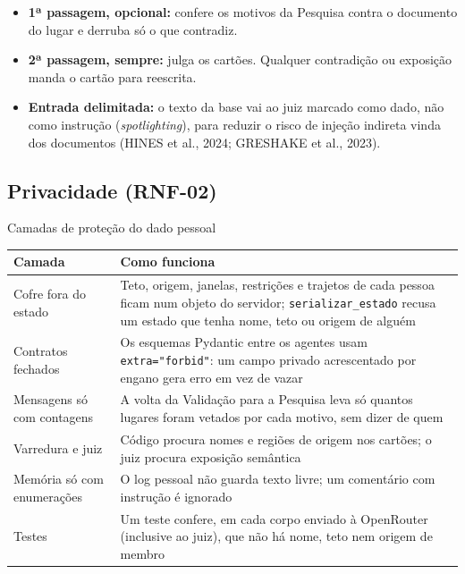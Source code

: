 \documentclass[12pt,a4paper]{article}
\newcommand{\fonte}[1]{\par\vspace{2pt}{\footnotesize\raggedright #1\par}}
\begin{document}
\begin{itemize}
\item \textbf{1ª passagem, opcional:} confere os motivos da Pesquisa contra o documento do lugar e derruba só o que contradiz.
\item \textbf{2ª passagem, sempre:} julga os cartões. Qualquer contradição ou exposição manda o cartão para reescrita.
\item \textbf{Entrada delimitada:} o texto da base vai ao juiz marcado como dado, não como instrução (\textit{spotlighting}), para reduzir o risco de injeção indireta vinda dos documentos (HINES et al., 2024; GRESHAKE et al., 2023).
\end{itemize}

\subsection{Privacidade (RNF-02)}
\begin{quadro}[H]\centering
\caption{Camadas de proteção do dado pessoal}
\small\renewcommand{\arraystretch}{1.15}
\begin{tabularx}{\textwidth}{|Y|Y|}
\hline
\textbf{Camada} & \textbf{Como funciona} \\ \hline
Cofre fora do estado & Teto, origem, janelas, restrições e trajetos de cada pessoa ficam num objeto do servidor; \texttt{serializar\_\allowbreak{}estado} recusa um estado que tenha nome, teto ou origem de alguém \\ \hline
Contratos fechados & Os esquemas Pydantic entre os agentes usam \texttt{extra="forbid"}: um campo privado acrescentado por engano gera erro em vez de vazar \\ \hline
Mensagens só com contagens & A volta da Validação para a Pesquisa leva só quantos lugares foram vetados por cada motivo, sem dizer de quem \\ \hline
Varredura e juiz & Código procura nomes e regiões de origem nos cartões; o juiz procura exposição semântica \\ \hline
Memória só com enumerações & O log pessoal não guarda texto livre; um comentário com instrução é ignorado \\ \hline
Testes & Um teste confere, em cada corpo enviado à OpenRouter (inclusive ao juiz), que não há nome, teto nem origem de membro \\ \hline
\end{tabularx}
\fonte{Fonte: elaborado pelo grupo.}
\end{quadro}
\end{document}
